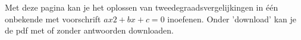 \documentclass{ximera}
\begin{document}
	\author{Wiskunde Op Maat}

Met deze pagina kan je het oplossen van tweedegraadsvergelijkingen in één onbekende met voorschrift \(ax2+bx+c=0\) inoefenen. 
Onder 'download' kan je de pdf met of zonder antwoorden downloaden.

\newcommand{\choicetwee}{{\wordChoice{\choice[correct]{twee oplossingen}\choice{één oplossing}\choice{geen oplossingen}}}}
\newcommand{\choiceeen}{{\wordChoice{\choice{twee oplossingen}\choice[correct]{één oplossing}\choice{geen oplossingen}}}}
\newcommand{\choicegeen}{{\wordChoice{\choice{twee oplossingen}\choice{één oplossing}\choice[correct]{geen oplossingen}}}}

\newcommand{\choicepositief}{{\wordChoice{\choice[correct]{positief}\choice{nul}\choice{negatief}}}}
\newcommand{\choicenul}{{\wordChoice{\choice{positief}\choice[correct]{nul}\choice{negatief}}}}
\newcommand{\choicenegatief}{{\wordChoice{\choice{positief}\choice{nul}\choice[correct]{negatief}}}}
 
\end{document}
